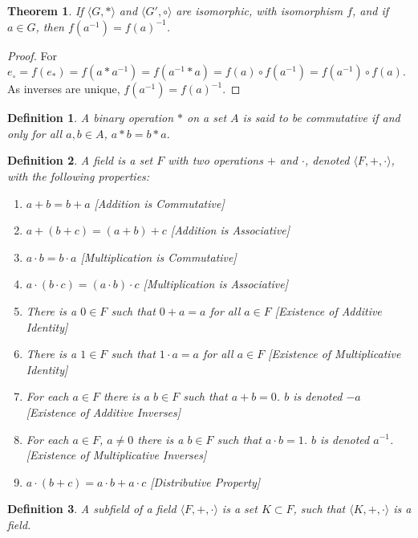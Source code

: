 \documentclass[oneside]{book}
\theoremstyle{mystyle}
\newtheorem{theorem}{Theorem}[section]
\newtheorem{definition}{Definition}[section]
\begin{document}
\begin{theorem}
If $\langle G, * \rangle$ and $\langle G', \circ \rangle$ are isomorphic, with isomorphism $f$, and if $a\in G$, then $f(a^{-1}) = f(a)^{-1}$.
\end{theorem}
\begin{proof}
For $e_{\circ}=f(e_*) = f(a*a^{-1}) = f(a^{-1}*a) = f(a)\circ f(a^{-1})=f(a^{-1})\circ f(a)$. As inverses are unique, $f(a^{-1})=f(a)^{-1}$.
\end{proof}

\begin{definition}
A binary operation $*$ on a set $A$ is said to be commutative if and only for all $a,b\in A$, $a*b = b*a$.
\end{definition}

\begin{definition}
A field is a set $F$ with two operations $+$ and $\cdot$, denoted $\langle F, +,\cdot \rangle$, with the following properties:
\begin{enumerate}
\item $a+b=b+a$ \hfill [Addition is Commutative]
\item $a+(b+c)=(a+b)+c$ \hfill [Addition is Associative]
\item $a\cdot b = b\cdot a$ \hfill [Multiplication is Commutative]
\item $a\cdot (b\cdot c) = (a\cdot b)\cdot c$ \hfill [Multiplication is Associative]
\item There is a $0\in F$ such that $0+a=a$ for all $a\in F$ \hfill [Existence of Additive Identity]
\item There is a $1\in F$ such that $1\cdot a = a$ for all $a\in F$ \hfill [Existence of Multiplicative Identity]
\item For each $a\in F$ there is a $b\in F$ such that $a+b = 0$. $b$ is denoted $-a$ \hfill [Existence of Additive Inverses]
\item For each $a\in F$, $a\ne 0$ there is a $b\in F$ such that $a\cdot b = 1$. $b$ is denoted $a^{-1}$. \hfill [Existence of Multiplicative Inverses]
\item $a\cdot(b+c) = a\cdot b + a\cdot c$ \hfill [Distributive Property]
\end{enumerate}
\end{definition}

\begin{definition}
A subfield of a field $\langle F,+,\cdot \rangle$ is a set $K\subset F$, such that $\langle K, +,\cdot \rangle$ is a field.
\end{definition}
\end{document}
